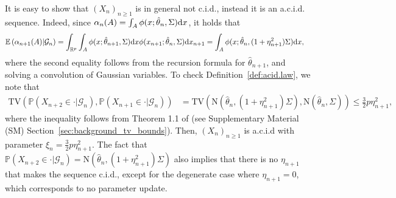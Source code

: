 \documentclass{article}
\theoremstyle{definition}
\newcommand{\di}{{\rm d}}
\renewcommand{\&}{and}
\begin{document}
It is easy to show that $(X_n)_{n \geq 1}$ is in general not c.i.d., instead it is an a.c.i.d. sequence. Indeed, since $\alpha_{n}(A) = \int_{A} \phi(x;\hat{\theta}_{n}, \Sigma) \di x$, it holds that
\begin{align*}
   \mathbb{E}\left(\alpha_{n+1}(A)  | \mathcal{G}_{n}\right)
     & = \int_{\mathbb{R}^p} \int_{A} \phi(x; \hat{\theta}_{n+1}, \Sigma )  \di x \phi(x_{n+1};\hat{\theta}_{n},\Sigma )  \di x_{n+1}   
     = \int_A \phi(x;\hat{\theta}_{n},(1+\eta_{n+1}^2) \Sigma) \di x,
\end{align*}
where the second equality follows from the recursion formula for $\hat{\theta}_{n+1}$, %
and solving a convolution of Gaussian variables. To check Definition~\ref{def:acid.law}, we note that 
\begin{align*}
 \text{TV}\left(\mathbb{P}(X_{n+2} \in \cdot |\mathcal{G}_{n}), \mathbb{P}(X_{n+1} \in \cdot |\mathcal{G}_{n}) \right) & =  \text{TV}\left(\text{N}(\hat{\theta}_{n},(1+\eta_{n+1}^2) \Sigma), \text{N}(\hat{\theta}_{n},\Sigma) \right) \leq \frac{3}{2} p \eta_{n+1}^2,
\end{align*}
where the inequality follows from Theorem 1.1 of \citep{devroye2018total} (see Supplementary Material (SM) Section~\ref{sec:background_tv_bounds}). Then, $(X_n)_{n\geq 1}$ is a.c.i.d with parameter $\xi_n = \frac{3}{2} p \eta_{n+1}^2$. The fact that $\mathbb{P}(X_{n+2}\in\cdot|\mathcal{G}_{n})=\text{N}(\hat{\theta}_{n},(1+\eta_{n+1}^2) \Sigma)$ also implies that there is no $\eta_{n+1}$ that makes the sequence c.i.d., except for the degenerate case where $\eta_{n+1}=0$, which corresponds to %
no parameter update. 
\end{document}
